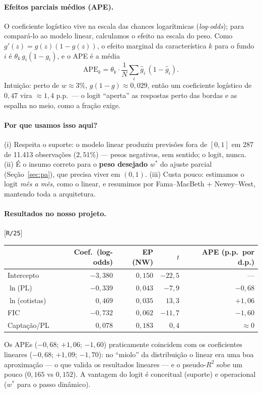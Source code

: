 \documentclass[11pt,a4paper]{article}
\newcommand{\porque}[0]{\paragraph{Por que usamos isso aqui?}}
\newcommand{\resultados}[0]{\paragraph{Resultados no nosso projeto.}}
\newcommand{\scriptref}[1]{{\footnotesize\color{cinza}[\texttt{#1}]}}
\begin{document}
\paragraph{Efeitos parciais médios (APE).} O coeficiente logístico vive na escala das chances
logarítmicas (\emph{log-odds}); para compará-lo ao modelo linear, calculamos o efeito na escala do
peso. Como $g'(z) = g(z)(1-g(z))$, o efeito marginal da característica $k$ para o fundo $i$ é
$\theta_k\, g_i(1-g_i)$, e o APE é a média
\begin{equation}
\mathrm{APE}_k = \theta_k \cdot \frac{1}{N}\sum_i \widehat g_i\,(1-\widehat g_i).
\end{equation}
Intuição: perto de $w\approx3\%$, $g(1-g)\approx0{,}029$, então um coeficiente logístico de
$0{,}47$ vira $\approx1{,}4$ p.p.\ --- o logit ``aperta'' as respostas perto das bordas e as
espalha no meio, como a fração exige.

\porque (i) Respeita o suporte: o modelo linear produziu previsões fora de $[0,1]$ em 287 de
11.413 observações ($2{,}51\%$) --- pesos negativos, sem sentido; o logit, nunca. (ii) É o insumo
correto para o \textbf{peso desejado} $w^*$ do ajuste parcial (Seção~\ref{sec:pa}), que precisa
viver em $(0,1)$. (iii) Custa pouco: estimamos o logit \emph{mês a mês}, como o linear, e
resumimos por Fama--MacBeth + Newey--West, mantendo toda a arquitetura.

\resultados \scriptref{R/25}

\begin{center}\small
\begin{tabular}{@{}lrrrr@{}}
\toprule
 & Coef.\ (log-odds) & EP (NW) & $t$ & APE (p.p.\ por d.p.) \\
\midrule
Intercepto & $-3{,}380$ & $0{,}150$ & $-22{,}5$ & --- \\
$\ln$(PL) & $-0{,}339$ & $0{,}043$ & $-7{,}9$ & $-0{,}68$ \\
$\ln$(cotistas) & $0{,}469$ & $0{,}035$ & $13{,}3$ & $+1{,}06$ \\
FIC & $-0{,}732$ & $0{,}062$ & $-11{,}7$ & $-1{,}60$ \\
Captação/PL & $0{,}078$ & $0{,}183$ & $0{,}4$ & $\approx0$ \\
\bottomrule
\end{tabular}
\end{center}

Os APEs ($-0{,}68$; $+1{,}06$; $-1{,}60$) praticamente coincidem com os coeficientes lineares
($-0{,}68$; $+1{,}09$; $-1{,}70$): no ``miolo'' da distribuição o linear era uma boa aproximação
--- o que valida os resultados lineares --- e o pseudo-$R^2$ sobe um pouco ($0{,}165$ vs
$0{,}152$). A vantagem do logit é conceitual (suporte) e operacional ($w^*$ para o passo
dinâmico).
\end{document}
